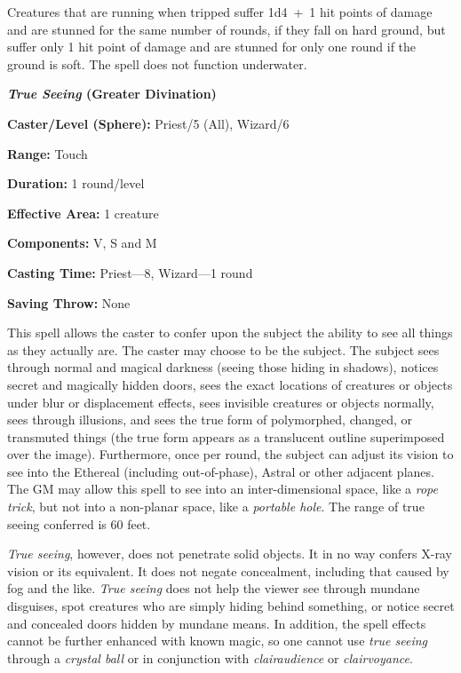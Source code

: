 \begin{multicols}{2}
Creatures that are running when tripped suffer 1d4~+~1 hit points of damage and are stunned for the same number of rounds, if they fall on hard ground, but suffer only 1 hit point of damage and are stunned for only one round if the ground is soft.  The spell does not function underwater.

\vspace{1em}

\noindent
\begin{minipage}{\columnwidth}

\noindent \textbf{\textit{True Seeing} (Greater Divination)}

\noindent \textbf{Caster/Level (Sphere):} Priest/5 (All), Wizard/6

\noindent \textbf{Range:} Touch

\noindent \textbf{Duration:} 1 round/level

\noindent \textbf{Effective Area:} 1 creature

\noindent \textbf{Components:} V, S and M

\noindent \textbf{Casting Time:} Priest---8, Wizard---1 round

\noindent \textbf{Saving Throw:} None

\end{minipage}

This spell allows the caster to confer upon the subject the ability to see all things as they actually are.  The caster may choose to be the subject.  The subject sees through normal and magical darkness (seeing those hiding in shadows), notices secret and magically hidden doors, sees the exact locations of creatures or objects under blur or displacement effects, sees invisible creatures or objects normally, sees through illusions, and sees the true form of polymorphed, changed, or transmuted things  (the true form appears as a translucent outline superimposed over the image).  Furthermore, once per round, the subject can adjust its vision to see into the Ethereal (including out-of-phase), Astral or other adjacent planes.  The GM may allow this spell to see into an inter-dimensional space, like a \textit{rope trick}, but not into a non-planar space, like a \textit{portable hole}.  The range of true seeing conferred is 60 feet. 

\textit{True seeing}, however, does not penetrate solid objects. It in no way confers X-ray vision or its equivalent.  It does not negate concealment, including that caused by fog and the like.  \textit{True seeing} does not help the viewer see through mundane disguises, spot creatures who are simply hiding behind something, or notice secret and concealed doors hidden by mundane means.  In addition, the spell effects cannot be further enhanced with known magic, so one cannot use \textit{true seeing} through a \textit{crystal ball} or in conjunction with \textit{clairaudience} or \textit{clairvoyance}. 


\end{multicols}
